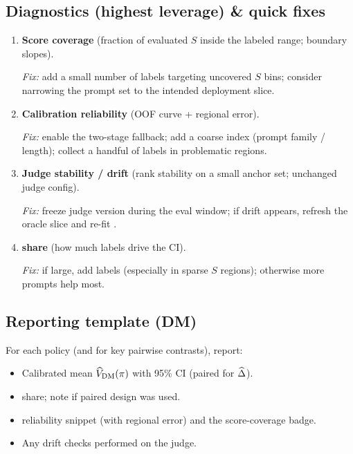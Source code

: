 \subsection{Diagnostics (highest leverage) \& quick fixes}

\begin{enumerate}[label=(\alph*)]
\item \textbf{Score coverage} (fraction of evaluated $S$ inside the labeled range; boundary slopes).

\emph{Fix:} add a small number of labels targeting uncovered $S$ bins; consider narrowing the prompt set to the intended deployment slice.

\item \textbf{Calibration reliability} (OOF curve + regional error).

\emph{Fix:} enable the two-stage \autocal{} fallback; add a coarse index (prompt family / length); collect a handful of labels in problematic regions.

\item \textbf{Judge stability / drift} (rank stability on a small anchor set; unchanged judge config).

\emph{Fix:} freeze judge version during the eval window; if drift appears, refresh the oracle slice and re-fit \autocal.

\item \textbf{\oua{} share} (how much labels drive the CI).

\emph{Fix:} if large, add labels (especially in sparse $S$ regions); otherwise more prompts help most.
\end{enumerate}

\subsection{Reporting template (DM)}

For each policy (and for key pairwise contrasts), report:

\begin{itemize}
\item Calibrated mean $\widehat{V}_{\text{DM}}(\pi)$ with 95\% CI (paired for $\widehat{\Delta}$).
\item \oua{} share; note if paired design was used.
\item \autocal{} reliability snippet (with regional error) and the score-coverage badge.
\item Any drift checks performed on the judge.
\end{itemize}

